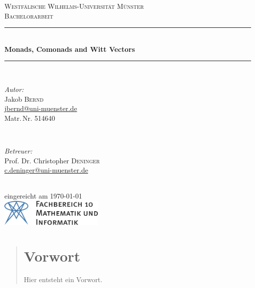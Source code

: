 \documentclass[a4paper,index=totoc,toc=bibliography,fontsize=10,DIV=13,headinclude,twoside,BCOR=12mm,cleardoublepage=empty,headsepline=1pt,draft]{scrreprt}
\begin{document}
\begin{titlepage}
	\newcommand{\HRule}{\rule{\linewidth}{0.5mm}} %

	\center %
 

	\textsc{\LARGE Westfälische Wilhelms-Universität Münster}\\[1.5cm] %
	\textsc{\Large Bachelorarbeit}\\[0.5cm] %


	\HRule \\[0.4cm]
	
	{\onehalfspacing\huge\sffamily\bfseries Monads, Comonads and Witt Vectors \singlespacing} %
	\vspace{-0.4cm}
	\HRule \\[1.5cm] 
	

	\begin{minipage}[t]{0.4\textwidth}
	\begin{flushleft} \large
	\emph{Autor:}\\
	Jakob \textsc{Bernd}\\ %
	\normalsize \url{jbernd@uni-muenster.de}\\
	Matr.\,Nr. 514640
	\end{flushleft}
	\end{minipage}
	~
	\begin{minipage}[t]{0.4\textwidth}
	\begin{flushright} \large
	\emph{Betreuer:} \\
	Prof. Dr. Christopher \textsc{Deninger}\\ %
	\normalsize \url{c.deninger@uni-muenster.de}
	\end{flushright}
	\end{minipage}\\[4cm]

	{\large eingereicht am \today}\\[3cm] %


	\includegraphics[height=1.3cm,keepaspectratio]{resources/fb10logo.pdf}\\[1cm] %
 

	\vfill %
	
\end{titlepage}
\begin{abstract}
\section*{Vorwort}
Hier entsteht ein Vorwort.
\end{abstract}
\tableofcontents
\cleardoubleoddemptypage
{}
\setcounter{page}{1}

%

\end{document}
